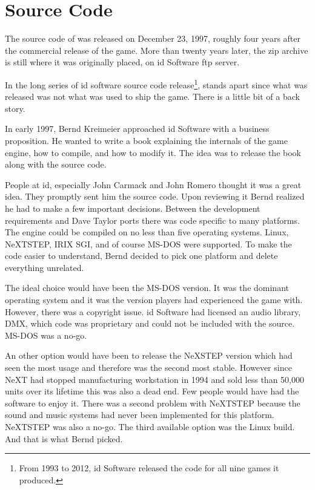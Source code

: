 \section{Source Code}
The source code of \doom{} was released on December 23, 1997, roughly four years after the commercial release of the game. More than twenty years later, the zip archive is still where it was originally placed, on id Software ftp server.\\
\par
{}
\par
 In the long series of id software source code release\footnote{From 1993 to 2012, id Software released the code for all nine games it produced.}, \doom{} stands apart since what was released was not what was used to ship the game. There is a little bit of a back story.\\
 \par
 In early 1997, Bernd Kreimeier approached id Software with a business proposition. He wanted to write a book explaining the internals of the game engine, how to compile, and how to modify it. The idea was to release the book along with the source code.\\
 \par
  People at id, especially John Carmack and John Romero thought it was a great idea. They promptly sent him the source code. Upon reviewing it Bernd realized he had to make a few important decisions. Between the development requirements and Dave Taylor ports there was code specific to many platforms. The engine could be compiled on no less than five operating systems. Linux, NeXTSTEP, IRIX SGI, and of course MS-DOS were supported. To make the code easier to understand, Bernd decided to pick one platform and delete everything unrelated.\\
  \par
  The ideal choice would have been the MS-DOS version. It was the dominant operating system and it was the version players had experienced the game with. However, there was a copyright issue. id Software had licensed an audio library, DMX, which code was proprietary and could not be included with the source. MS-DOS was a no-go.\\
  \par
   An other option would have been to release the NeXSTEP version which had seen the most usage and therefore was the second most stable. However since NeXT had stopped manufacturing workstation in 1994 and sold less than 50,000 units over its lifetime this was also a dead end. Few people would have had the software to enjoy it. There was a second problem with NeXTSTEP because the sound and music systems had never been implemented for this platform. NeXTSTEP was also a no-go. The third available option was the Linux build. And that is what Bernd picked.\\
